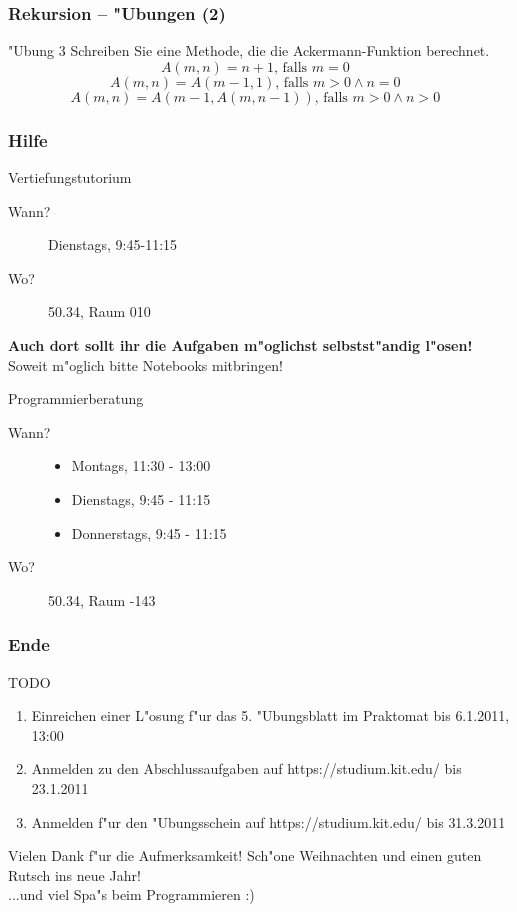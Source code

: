 \documentclass{beamer}
\begin{document}
\begin{frame}
\frametitle{Rekursion -- "Ubungen (2)}
\begin{block}{"Ubung 3}
Schreiben Sie eine Methode, die die Ackermann-Funktion berechnet.
$$A(m,n) = n + 1\textrm{, falls $m = 0$ }$$
$$A(m,n) = A(m - 1, 1)\textrm{, falls $m > 0 \wedge n = 0$ }$$
$$A(m,n) = A(m - 1, A(m, n - 1))\textrm{, falls $m > 0 \wedge n > 0$ }$$
\end{block}
\end{frame}


\begin{frame}
\frametitle{Hilfe}
\begin{block}{Vertiefungstutorium}
\begin{description}
\item[Wann?] Dienstags, 9:45-11:15
\item[Wo?] 50.34, Raum 010
\end{description}
\textbf{Auch dort sollt ihr die Aufgaben m"oglichst selbstst"andig l"osen!}
\alert{Soweit m"oglich bitte Notebooks mitbringen!}
\end{block}

\begin{block}{Programmierberatung}
\begin{description}
\item[Wann?]
\begin{itemize}
\item Montags, 11:30 - 13:00
\item Dienstags, 9:45 - 11:15
\item Donnerstags, 9:45 - 11:15
\end{itemize}
\item[Wo?] 50.34, Raum -143
\end{description}
\end{block}
\end{frame}


\begin{frame}
\frametitle{Ende}
\begin{block}{TODO}
\begin{enumerate}
\item Einreichen einer L"osung f"ur das 5. "Ubungsblatt im Praktomat bis \alert{6.1.2011, 13:00}
\item Anmelden zu den Abschlussaufgaben auf https://studium.kit.edu/ bis \alert{23.1.2011}
\item Anmelden f"ur den "Ubungsschein auf https://studium.kit.edu/ bis \alert{31.3.2011}
\end{enumerate}
\end{block}

\begin{block}{Vielen Dank f"ur die Aufmerksamkeit!}
Sch"one Weihnachten und einen guten Rutsch ins neue Jahr!\\
...und viel Spa"s beim Programmieren :)
\end{block}
\end{frame}
\end{document}
